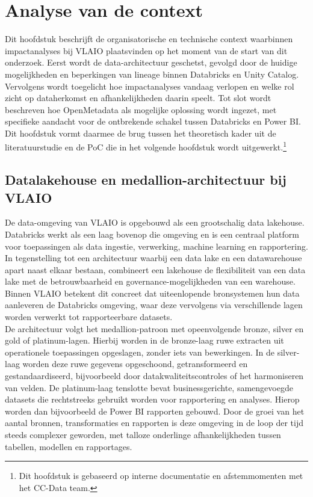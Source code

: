 \chapter{Analyse van de context}
\label{ch:contextanalyse}

Dit hoofdstuk beschrijft de organisatorische en technische context waarbinnen impactanalyses bij VLAIO plaatsvinden op het moment van de start van dit onderzoek. Eerst wordt de data-architectuur geschetst, gevolgd door de huidige mogelijkheden en beperkingen van lineage binnen Databricks en Unity Catalog. Vervolgens wordt toegelicht hoe impactanalyses vandaag verlopen en welke rol zicht op dataherkomst en afhankelijkheden daarin speelt. Tot slot wordt beschreven hoe OpenMetadata als mogelijke oplossing wordt ingezet, met specifieke aandacht voor de ontbrekende schakel tussen Databricks en Power BI. Dit hoofdstuk vormt daarmee de brug tussen het theoretisch kader uit de literatuurstudie en de PoC die in het volgende hoofdstuk wordt uitgewerkt.\footnote{Dit hoofdstuk is gebaseerd op interne documentatie en afstemmomenten met het CC-Data team.}

\section{Datalakehouse en medallion-architectuur bij VLAIO}

De data-omgeving van VLAIO is opgebouwd als een grootschalig data lakehouse. Databricks werkt als een laag bovenop die omgeving en is een centraal platform voor toepassingen als data ingestie, verwerking, machine learning en rapportering. In tegenstelling tot een architectuur waarbij een data lake en een datawarehouse apart naast elkaar bestaan, combineert een lakehouse de flexibiliteit van een data lake met de betrouwbaarheid en governance-mogelijkheden van een warehouse. Binnen VLAIO betekent dit concreet dat uiteenlopende bronsystemen hun data aanleveren de Databricks omgeving, waar deze vervolgens via verschillende lagen worden verwerkt tot rapporteerbare datasets.\\

De architectuur volgt het medallion-patroon met opeenvolgende bronze, silver en gold of platinum-lagen. Hierbij worden in de bronze-laag ruwe extracten uit operationele toepassingen opgeslagen, zonder iets van bewerkingen. In de silver-laag worden deze ruwe gegevens opgeschoond, getransformeerd en gestandaardiseerd, bijvoorbeeld door datakwaliteitscontroles of het harmoniseren van velden. De pla\-ti\-num-laag tenslotte bevat businessgerichte, samengevoegde datasets die rechtstreeks gebruikt worden voor rapportering en analyses. Hierop worden dan bijvoorbeeld de Power BI rapporten gebouwd. Door de groei van het aantal bronnen, transformaties en rapporten is deze omgeving in de loop der tijd steeds complexer geworden, met talloze onderlinge afhankelijkheden tussen tabellen, modellen en rapportages.\\

